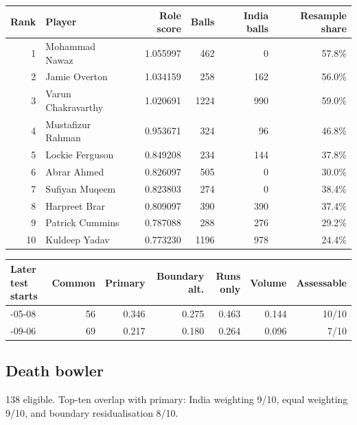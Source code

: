 \begin{center}
\begin{tabularx}{\linewidth}{r>{\raggedright\arraybackslash}Xrrrr}
\toprule
Rank & Player & Role score & Balls & India balls & Resample share \\
\midrule
1 & Mohammad Nawaz & 1.055997 & 462 & 0 & 57.8\% \\
2 & Jamie Overton & 1.034159 & 258 & 162 & 56.0\% \\
3 & Varun Chakravarthy & 1.020691 & 1224 & 990 & 59.0\% \\
4 & Mustafizur Rahman & 0.953671 & 324 & 96 & 46.8\% \\
5 & Lockie Ferguson & 0.849208 & 234 & 144 & 37.8\% \\
6 & Abrar Ahmed & 0.826097 & 505 & 0 & 30.0\% \\
7 & Sufiyan Muqeem & 0.823803 & 274 & 0 & 38.4\% \\
8 & Harpreet Brar & 0.809097 & 390 & 390 & 37.4\% \\
9 & Patrick Cummins & 0.787088 & 288 & 276 & 29.2\% \\
10 & Kuldeep Yadav & 0.773230 & 1196 & 978 & 24.4\% \\
\bottomrule
\end{tabularx}
\end{center}

\begin{center}
\begin{tabularx}{\linewidth}{>{\raggedright\arraybackslash}Xrrrrrr}
\toprule
Later test starts & Common & Primary & Boundary alt. & Runs only & Volume & Assessable \\
\midrule
2024-05-08 & 56 & 0.346 & 0.275 & 0.463 & 0.144 & 10/10 \\
2025-09-06 & 69 & 0.217 & 0.180 & 0.264 & 0.096 & 7/10 \\
\bottomrule
\end{tabularx}
\end{center}

\subsection{Death bowler}

138 eligible. Top-ten overlap with primary: India weighting 9/10, equal weighting 9/10, and boundary residualisation 8/10.

